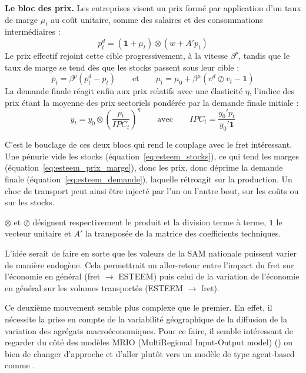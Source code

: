 \documentclass[12pt,a4paper,french]{report}
\newcounter{encadre}
\renewcommand{\theencadre}{\arabic{encadre}}
\newenvironment{encadre}[2]{%
	\refstepcounter{encadre}%
	\label{#1}%
	\begin{mdframed}[frametitle={Encadré \theencadre~: #2}]
}{%
	\end{mdframed}
}
\begin{document}
\begin{encadre}{enc:esteem}{Qu'est-ce que le modèle ESTEEM ?}
		\medskip
		\textbf{Le bloc des prix.} Les entreprises visent un prix formé par application d'un taux de marge $\mu_t$ au coût unitaire, somme des salaires et des consommations intermédiaires :
		\begin{equation}
			p_t^d = (\mathbf{1}+\mu_t)\otimes\left(w + A'p_t\right)
			\label{eq:esteem_prix_cible}
		\end{equation}
		Le prix effectif rejoint cette cible progressivement, à la vitesse $\beta^p$, tandis que le taux de marge se tend dès que les stocks passent sous leur cible :
		\begin{equation}
			\dot{p}_t = \beta^p\left(p_t^d - p_t\right) \qquad \text{et} \qquad \mu_t = \mu_0 + \beta^\mu\left(v^d \oslash v_t - \mathbf{1}\right)
			\label{eq:esteem_prix_marge}
		\end{equation}
		La demande finale réagit enfin aux prix relatifs avec une élasticité $\eta$, l'indice des prix étant la moyenne des prix sectoriels pondérée par la demande finale initiale :
		\begin{equation}
			y_t = y_0 \otimes \left(\frac{p_t}{IPC_t}\right)^{\eta} \qquad \text{avec} \qquad IPC_t = \frac{y_0'p_t}{y_0'\mathbf{1}}
			\label{eq:esteem_demande}
		\end{equation}

		\medskip
		C'est le bouclage de ces deux blocs qui rend le couplage avec le fret intéressant. Une pénurie vide les stocks (équation~\ref{eq:esteem_stocks}), ce qui tend les marges (équation~\ref{eq:esteem_prix_marge}), donc les prix, donc déprime la demande finale (équation~\ref{eq:esteem_demande}), laquelle rétroagit sur la production. Un choc de transport peut ainsi être injecté par l'un ou l'autre bout, sur les coûts ou sur les stocks.

		\medskip
		{\footnotesize $\otimes$ et $\oslash$ désignent respectivement le produit et la division terme à terme, $\mathbf{1}$ le vecteur unitaire et $A'$ la transposée de la matrice des coefficients techniques.}
	\end{encadre}
	
	L'idée serait de faire en sorte que les valeurs de la SAM nationale puissent varier de manière endogène. Cela permettrait un aller-retour entre l'impact du fret sur l'économie en général (fret $\to$ ESTEEM) puis celui de la variation de l'économie en général sur les volumes transportés (ESTEEM $\to$ fret).
	
	Ce deuxième mouvement semble plus complexe que le premier. En effet, il nécessite la prise en compte de la variabilité géographique de la diffusion de la variation des agrégats macroéconomiques. Pour ce faire, il semble intéressant de regarder du côté des modèles MRIO (MultiRegional Input-Output model) (\cite{Miller2009}) ou bien de changer d'approche et d'aller plutôt vers un modèle de type agent-based comme \cite{Colon2021}.
	
\end{document}

